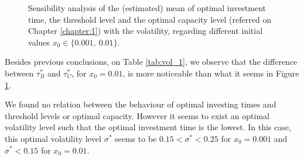 \begin{figure}[!ht]
	\begin{subfigmatrix}{3}
	\end{subfigmatrix}
	\caption{Sensibility analysis of the (estimated) mean of optimal investment time, the threshold level and the optimal capacity level (referred on Chapter \ref{chapter:1}) with the volatility, regarding different initial values $x_0 \in \{0.001, \ 0.01\}$.}
	\label{fig:vol_1}
\end{figure}

Besides previous conclusions, on Table \ref{tab:vol_1}, we observe that the difference between $\tau_B^*$ and $\tau_C^*$, for $x_0=0.01$, is more noticeable than what it seems in Figure \ref{fig:vol_1}.

We found no relation between the behaviour of optimal investing times and threshold levels or optimal capacity. However it seems to exist an optimal volatility level such that the optimal investment time is the lowest. In this case, this optimal volatility level $\sigma^*$ seems to be $0.15 < \sigma^* < 0.25$ for $x_0=0.001$ and $\sigma^*<0.15$ for $x_0=0.01$.

